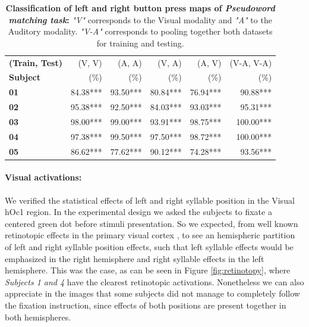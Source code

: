 \begin{table}
\begin{tabular}{|>{\bfseries}l|rrrrr|}
\toprule
(Train, Test) & (V, V) & (A, A) & (V, A) & (A, V) & (V-A, V-A) \\
Subject & (\%) &  (\%)   & (\%)  & (\%)  &   (\%)\\
\midrule
01      &   84.38*** &   93.50*** &   80.84*** &   76.94*** &           90.88*** \\
02      &   95.38*** &   92.50*** &   84.03*** &   93.03*** &           95.31*** \\
03      &   98.00*** &   99.00*** &   93.91*** &   98.75*** &          100.00*** \\
04      &   97.38*** &   99.50*** &   97.50*** &   98.72*** &          100.00*** \\
05      &   86.62*** &   77.62*** &   90.12*** &   74.28*** &           93.56*** \\
\bottomrule
\end{tabular}
\vspace{5ex}
\caption{\textbf{Classification of left and right button press maps of \emph{Pseudoword matching task}:} \emph{"V"} corresponds to the Visual modality and \emph{"A"} to the Auditory modality. \emph{"V-A"} corresponds to pooling together both datasets for training and testing.}
\label{table:clic}
\end{table}


\paragraph{Visual activations:}
We verified the statistical effects of left and right syllable position in the Visual hOc1 region.
In the experimental design we asked the subjects to fixate a centered green dot before stimuli presentation.
So we expected, from well known retinotopic effects in the primary visual cortex \citep{tootell1998retinotopy}, to see an hemispheric partition of left and right syllable position effects, such that left syllable effects would be emphasized in the right hemisphere and right syllable effects in the left hemisphere.
This was the case, as can be seen in Figure \ref{fig:retinotopy}, where \emph{Subjects 1 and 4} have the clearest retinotopic activations.
Nonetheless we can also appreciate in the images that some subjects did not manage to completely follow the fixation instruction, since effects of both positions are present together in both hemispheres.


